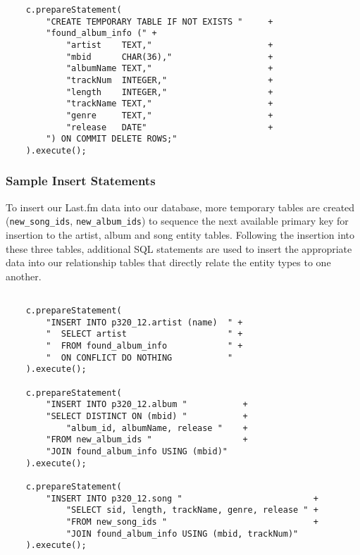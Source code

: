 \documentclass[12pt]{article}
\begin{document}
    \begin{lstlisting}
    c.prepareStatement(
        "CREATE TEMPORARY TABLE IF NOT EXISTS "     +
        "found_album_info (" +
            "artist    TEXT,"                       +
            "mbid      CHAR(36),"                   +
            "albumName TEXT,"                       +
            "trackNum  INTEGER,"                    +
            "length    INTEGER,"                    +
            "trackName TEXT,"                       +
            "genre     TEXT,"                       +
            "release   DATE"                        +
        ") ON COMMIT DELETE ROWS;"
    ).execute();

    \end{lstlisting}

    \subsubsection{Sample Insert Statements}

    \noindent To insert our Last.fm data into our database,
    more temporary tables are created (\lstinline{new_song_ids},
    \lstinline{new_album_ids}) to sequence the next available
    primary key for insertion to the artist, album and song entity
    tables. Following the insertion into these three tables,
    additional SQL statements are used to insert
    the appropriate data into our relationship tables that directly
    relate the entity types to one another.

    \begin{lstlisting}

    c.prepareStatement(
        "INSERT INTO p320_12.artist (name)  " +
        "  SELECT artist                    " +
        "  FROM found_album_info            " +
        "  ON CONFLICT DO NOTHING           "
    ).execute();

    c.prepareStatement(
        "INSERT INTO p320_12.album "           +
        "SELECT DISTINCT ON (mbid) "           +
            "album_id, albumName, release "    +
        "FROM new_album_ids "                  +
        "JOIN found_album_info USING (mbid)"
    ).execute();

    c.prepareStatement(
        "INSERT INTO p320_12.song "                          +
            "SELECT sid, length, trackName, genre, release " +
            "FROM new_song_ids "                             +
            "JOIN found_album_info USING (mbid, trackNum)"
    ).execute();
    \end{lstlisting}
\end{document}
